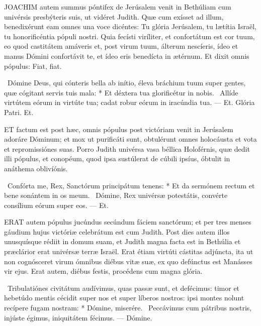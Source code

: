 

\lettrine[lines=2]{J}{OACHIM} autem summus póntifex de Jerúsalem venit in Bethúliam cum univérsis presbýteris suis, ut vidéret Judith. Quæ cum exísset ad illum, benedixérunt eam omnes una voce dicéntes: Tu glória Jerúsalem, tu lætítia Israël, tu honorificéntia pópuli nostri. Quia fecísti viríliter, et confortátum est cor tuum, eo quod castitátem amáveris et, post virum tuum, álterum nescíeris, ídeo et manus Dómini confortávit te, et ídeo eris benedícta in ætérnum. Et dixit omnis pópulus: Fiat, fiat.

\R\ Dómine Deus, qui cónteris bella ab inítio, éleva bráchium tuum super gentes, quæ cógitant servis tuis mala: * Et déxtera tua glorificétur in nobis. \V\ Allíde virtútem eórum in virtúte tua; cadat robur eórum in iracúndia tua. — Et. Glória Patri. Et.




\lettrine[lines=2]{E}{T} factum est post hæc, omnis pópulus post victóriam venit in Jerúsalem adoráre Dóminum; et mox ut purificáti sunt, obtulérunt omnes holocáusta et vota et repromissiónes suas. Porro Judith univérsa vasa béllica Holoférnis, quæ dedit illi pópulus, et conopéum, quod ipsa sustúlerat de cúbili ipsíus, óbtulit in anáthema oblivíónis.

\R\ Confórta me, Rex, Sanctórum principátum tenens: * Et da sermónem rectum et bene sonántem in os meum. \V\ Dómine, Rex univérsæ potestátis, convérte consílium eórum super eos. — Et.


\lettrine[lines=2]{E}{RAT} autem pópulus jucúndus secúndum fáciem sanctórum; et per tres menses gáudium hujus victóriæ celebrátum est cum Judith. Post dies autem illos unusquísque rédiit in domum suam, et Judith magna facta est in Bethúlia et præclárior erat univérsæ terræ Israël. Erat étiam virtúti cástitas adjúncta, ita ut non cognósceret virum ómnibus diébus vitæ suæ, ex quo defúnctus est Manásses vir ejus. Erat autem, diébus festis, procédens cum magna glória.

\R\ Tribulatiónes civitátum audívimus, quas passæ sunt, et defécimus: timor et hebetúdo mentis cécidit super nos et super líberos nostros: ipsi montes nolunt recípere fugam nostram: * Dómine, miserére. \V\ Peccávimus cum pátribus nostris, injúste égimus, iniquitátem fécimus. — Dómine.

